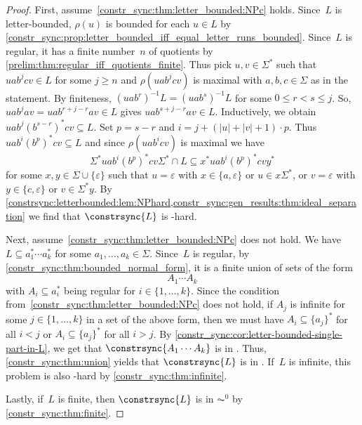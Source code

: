 \begin{proof}
	First, assume~\cref{constr_sync:thm:letter_bounded:NPc} holds.
	Since~$L$ is letter-bounded, 
	$\rho(u)$ is bounded for each $u \in L$ by \cref{constr_sync:prop:letter_bounded_iff_equal_letter_runs_bounded}.
	Since~$L$ is regular, it has a finite number~$n$
	of quotients by \cref{prelim:thm:regular_iff_quotients_finite}. 
	Thus pick $u,v \in \Sigma^*$ such that $uab^jcv \in L$
	for some $j \ge n$ and $\rho(uab^jcv)$ is maximal
	with $a,b,c \in \Sigma$ as in the statement.
	By finiteness, $(uab^r)^{-1}L = (uab^s)^{-1}L$
	for some  $0 \le r < s \le j$. 
	So, $uab^jav = uab^{r + j - r}av \in L$ 
	gives $uab^{s + j - r}av \in L$.
	Inductively, we obtain
	$uab^j(b^{s-r})^*cv \subseteq L$.
	Set $p = s - r$ and $i = j + (|u| + |v| + 1) \cdot p$.
	Thus $uab^i (b^p)^* cv \subseteq L$ and since $\rho(uab^icv)$ is maximal we have
	\[
	\Sigma^* uab^i (b^p)^* cv \Sigma^* \cap L
	\subseteq x^* uab^i (b^p)^* cv y^*
	\] %
	for some $x,y \in \Sigma \cup \{\varepsilon\}$
	such that $u = \varepsilon$ with $x \in \{a,\varepsilon\}$
	or $u \in x\Sigma^*$,
	or $v = \varepsilon$ with $y \in \{c,\varepsilon\}$
	or $v \in \Sigma^*y$.
	By \cref{constrsync:letterbounded:lem:NPhard,constr_sync:gen_results:thm:ideal_separation} 
	we find that $\constrsync{L}$ is \NP-hard.
	
	Next, assume~\cref{constr_sync:thm:letter_bounded:NPc} does not hold.
	We have $L \subseteq a_1^* \cdots a_k^*$ for some $a_1, \ldots, a_k \in \Sigma$.
	Since~$L$ is regular, by \cref{constr_sync:thm:bounded_normal_form},
	it is a finite union of sets of the form
	\[
	A_1 \cdots A_k
	\]
	with $A_i \subseteq a_i^*$ being regular for $i \in \{1,\ldots,k\}$.
	Since the condition from~\cref{constr_sync:thm:letter_bounded:NPc} 
	does not hold, if $A_j$ is infinite for some $j \in \{1,\ldots,k\}$
	in a set of the above form, then we must have $A_i \subseteq \{a_j\}^*$
	for all $i < j$ or $A_i \subseteq \{a_j\}^*$ for all $i > j$.
	By \cref{constr_sync:cor:letter-bounded-single-part-in-L},
	we get that $\constrsync{A_1\cdots A_k}$
	is in \LOGSPACE.
	Thus, \cref{constr_sync:thm:union} yields that $\constrsync{L}$
	is in \LOGSPACE. If~$L$
	is infinite, this problem is also \LOGSPACE-hard
	by \cref{constr_sync:thm:infinite}.
	
	Lastly, if~$L$ is finite,
	then $\constrsync{L}$ is in $\AC^0$ by \cref{constr_sync:thm:finite}.
\end{proof}
